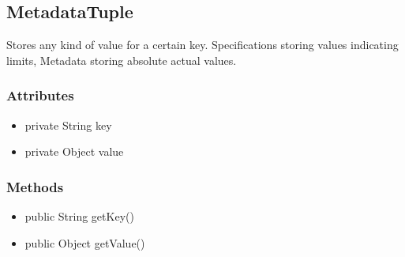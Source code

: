 \subsection{MetadataTuple}
Stores any kind of value for a certain key. Specifications storing values indicating limits, Metadata storing absolute actual values.

\subsubsection{Attributes}
\begin{itemize}
	\item private  String key
	\item private  Object value
\end{itemize}
\subsubsection{Methods}
\begin{itemize}
	\item public  String getKey()
	\item public  Object getValue()
\end{itemize}